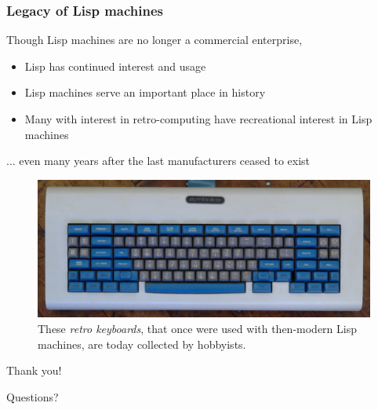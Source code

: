 \documentclass{beamer}
\begin{document}
\begin{frame}
\begin{columns}[c]
		\end{columns}
		
	\end{frame}
	\begin{frame}
		\frametitle{Legacy of Lisp machines}
	
	
	Though Lisp machines are no longer a commercial enterprise,
	
		\begin{itemize}
			\item Lisp has continued interest and usage
			\item Lisp machines serve an important place in history
			\item Many with interest in retro-computing have recreational interest in Lisp machines
		\end{itemize}
		
		... even many years after the last manufacturers ceased to exist
		
		\begin{figure}
			\includegraphics[width=0.6\linewidth]{../img/keyboard}\caption{These \textit{retro keyboards}, that once were used with then-modern Lisp machines, are today collected by hobbyists.}
		\end{figure}
	
\end{frame}


\begin{frame}
	\Huge{\centerline{Thank you!}}
	\Huge{\centerline{ }}
	\Huge{\centerline{Questions?}}
\end{frame}

\end{document}
